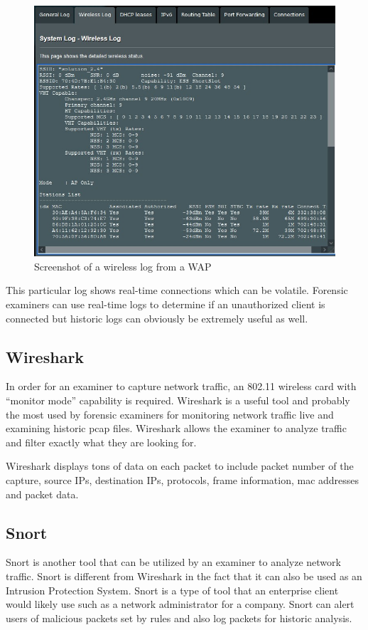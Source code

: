 \documentclass[acmlarge]{style/acmart}
\begin{document}
\begin{figure}[H]
 \centering
  \includegraphics[width=0.5\linewidth]{imgs/waplog.jpg}
  \caption{Screenshot of a wireless log from a WAP}
  \label{fig:waplog}
\end{figure}

This particular log shows real-time connections which can be volatile. Forensic examiners can use real-time logs to determine if an unauthorized client is connected but historic logs can obviously be extremely useful as well. 

\subsection{Wireshark}

In order for an examiner to capture network traffic, an 802.11 wireless card with “monitor mode” capability is required. Wireshark is a useful tool and probably the most used by forensic examiners for monitoring network traffic live and examining historic pcap files. Wireshark allows the examiner to analyze traffic and filter exactly what they are looking for. 


Wireshark displays tons of data on each packet to include packet number of the capture, source IPs, destination IPs, protocols, frame information, mac addresses and packet data. 

\subsection{Snort}

Snort is another tool that can be utilized by an examiner to analyze network traffic. Snort is different from Wireshark in the fact that it can also be used as an Intrusion Protection System. Snort is a type of tool that an enterprise client would likely use such as a network administrator for a company. Snort can alert users of malicious packets set by rules and also log packets for historic analysis. 
\end{document}

